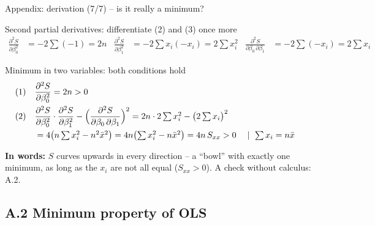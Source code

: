 \documentclass[aspectratio=169,11pt]{beamer}
\newcommand{\tsum}{\textstyle\sum}
\begin{document}
\begin{frame}{Appendix: derivation (7/7) -- is it really a minimum?}
  \begin{block}{Second partial derivatives: differentiate (2) and (3) once more}
    \vspace{-8pt}
    \small
    \begin{align*}
      \frac{\partial^{2} S}{\partial \beta_0^{2}} &= -2\tsum(-1) = 2n
      & \frac{\partial^{2} S}{\partial \beta_1^{2}} &= -2\tsum x_i(-x_i) = 2\tsum x_i^{2}
      & \frac{\partial^{2} S}{\partial \beta_0\,\partial \beta_1} &= -2\tsum (-x_i) = 2\tsum x_i
    \end{align*}
    \vspace{-14pt}
  \end{block}

  \begin{block}{Minimum in two variables: both conditions hold}
    \vspace{-8pt}
    \small
    \begin{align*}
      &\text{(1)}\quad \frac{\partial^{2} S}{\partial \beta_0^{2}} = 2n > 0 \\
      &\text{(2)}\quad \frac{\partial^{2} S}{\partial \beta_0^{2}} \cdot \frac{\partial^{2} S}{\partial \beta_1^{2}}
         - \Bigl(\frac{\partial^{2} S}{\partial \beta_0\,\partial \beta_1}\Bigr)^{2}
         = 2n \cdot 2\tsum x_i^{2} - \bigl(2\tsum x_i\bigr)^{2} \\
      &\phantom{\text{(2)}\quad} = 4\bigl(n\tsum x_i^{2} - n^{2}\bar{x}^{2}\bigr)
         = 4n\bigl(\tsum x_i^{2} - n\bar{x}^{2}\bigr) = 4n\,S_{xx} > 0
         && \mid\ \tsum x_i = n\bar{x}
    \end{align*}
    \vspace{-14pt}
  \end{block}

  \footnotesize \textbf{In words:} $S$ curves upwards in every direction -- a
  ``bowl'' with exactly one minimum, as long as the $x_i$ are not all equal
  ($S_{xx} > 0$). A check without calculus: A.2.
  \hfill\hyperlink{solutionpath}{}
\end{frame}

\subsection{A.2 Minimum property of OLS}
\end{document}
